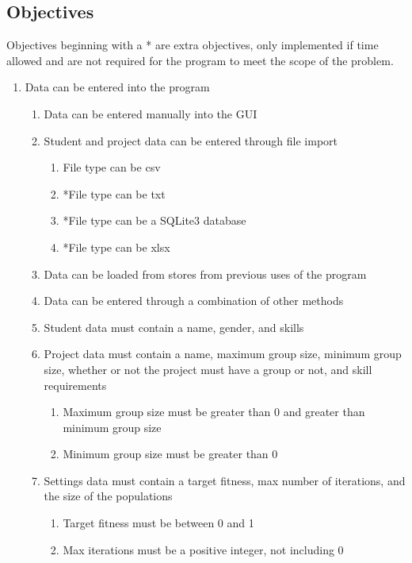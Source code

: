 \documentclass{article}
\begin{document}
\subsection{Objectives}
Objectives beginning with a * are extra objectives, only implemented if time allowed and are not required for the program to meet the scope of the problem.
\begin{enumerate}
    \item Data can be entered into the program
        \begin{enumerate} 
            \item Data can be entered manually into the GUI
            \item Student and project data can be entered through file import
            \begin{enumerate}
                \item File type can be csv
                \item *File type can be txt
                \item *File type can be a SQLite3 database
                \item *File type can be xlsx
            \end{enumerate}
            \item Data can be loaded from stores from previous uses of the program
            \item Data can be entered through a combination of other methods
            \item Student data must contain a name, gender, and skills
            \item Project data must contain a name, maximum group size, minimum group size, whether or not the project must have a group or not, and skill requirements
            \begin{enumerate}
                \item Maximum group size must be greater than 0 and greater than minimum group size
                \item Minimum group size must be greater than 0
            \end{enumerate}
            \item Settings data must contain a target fitness, max number of iterations, and the size of the populations
            \begin{enumerate}
                \item Target fitness must be between 0 and 1
                \item Max iterations must be a positive integer, not including 0

\end{enumerate}
\end{enumerate}
\end{enumerate}
\end{document}
